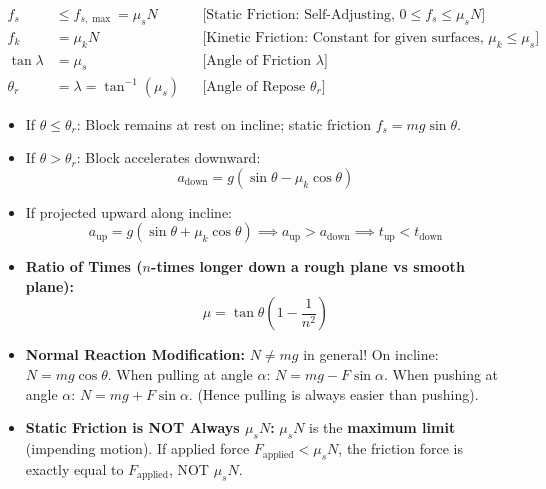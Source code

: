\documentclass[11pt,a4paper]{article}
\begin{document}
\begin{formulabox}
\begin{align}
  f_s &\le f_{s,\max} = \mu_s N && \text{[Static Friction: Self-Adjusting, $0 \le f_s \le \mu_s N$]} \\
  f_k &= \mu_k N && \text{[Kinetic Friction: Constant for given surfaces, $\mu_k \le \mu_s$]} \\
  \tan\lambda &= \mu_s && \text{[Angle of Friction $\lambda$]} \\
  \theta_r &= \lambda = \tan^{-1}(\mu_s) && \text{[Angle of Repose $\theta_r$]}
\end{align}
\end{formulabox}

\begin{usecasebox}
\begin{itemize}
  \item If $\theta \le \theta_r$: Block remains at rest on incline; static friction $f_s = mg\sin\theta$.
  \item If $\theta > \theta_r$: Block accelerates downward:
  \begin{equation*}
    a_{\text{down}} = g(\sin\theta - \mu_k\cos\theta)
  \end{equation*}
  \item If projected upward along incline:
  \begin{equation*}
    a_{\text{up}} = g(\sin\theta + \mu_k\cos\theta) \implies a_{\text{up}} > a_{\text{down}} \implies t_{\text{up}} < t_{\text{down}}
  \end{equation*}
  \item \textbf{Ratio of Times ($n$-times longer down a rough plane vs smooth plane):}
  \begin{equation*}
    \mu = \tan\theta\left(1 - \frac{1}{n^2}\right)
  \end{equation*}
\end{itemize}
\end{usecasebox}

\begin{trapbox}
\begin{itemize}
  \item \textbf{Normal Reaction Modification:} $N \ne mg$ in general! On incline: $N = mg\cos\theta$. When pulling at angle $\alpha$: $N = mg - F\sin\alpha$. When pushing at angle $\alpha$: $N = mg + F\sin\alpha$. (Hence pulling is always easier than pushing).
  \item \textbf{Static Friction is NOT Always $\mu_s N$:} $\mu_s N$ is the \textbf{maximum limit} (impending motion). If applied force $F_{\text{applied}} < \mu_s N$, the friction force is exactly equal to $F_{\text{applied}}$, NOT $\mu_s N$.
\end{itemize}
\end{trapbox}
\end{document}
